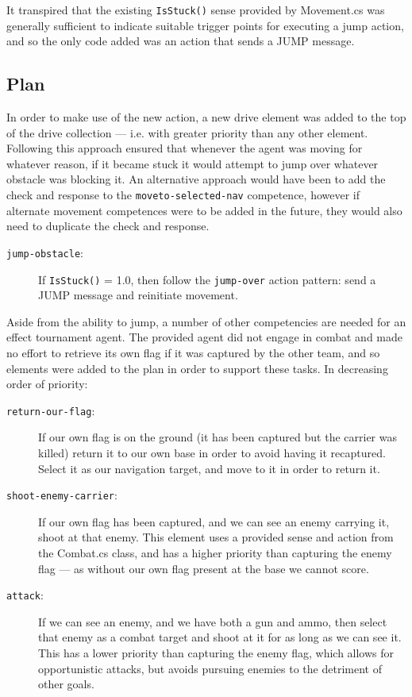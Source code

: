 \documentclass[a4paper,12pt]{article}
\begin{document}
It transpired that the existing \texttt{IsStuck()} sense provided by Movement.cs was generally sufficient to indicate suitable trigger points for executing a jump action, and so the only code added was an action that sends a JUMP message.

\subsection{Plan}
In order to make use of the new action, a new drive element was added to the top of the drive collection --- i.e. with greater priority than any other element. Following this approach ensured that whenever the agent was moving for whatever reason, if it became stuck it would attempt to jump over whatever obstacle was blocking it. An alternative approach would have been to add the check and response to the \texttt{moveto-selected-nav} competence, however if alternate movement competences were to be added in the future, they would also need to duplicate the check and response.
\begin{description}
	\item[\texttt{jump-obstacle}:] If \texttt{IsStuck()} = 1.0, then follow the \texttt{jump-over} action pattern: send a JUMP message and reinitiate movement.
\end{description}

Aside from the ability to jump, a number of other competencies are needed for an effect tournament agent. The provided agent did not engage in combat and made no effort to retrieve its own flag if it was captured by the other team, and so elements were added to the plan in order to support these tasks. In decreasing order of priority:
\begin{description}
	\item[\texttt{return-our-flag}:] If our own flag is on the ground (it has been captured but the carrier was killed) return it to our own base in order to avoid having it recaptured. Select it as our navigation target, and move to it in order to return it.
	\item[\texttt{shoot-enemy-carrier}:] If our own flag has been captured, and we can see an enemy carrying it, shoot at that enemy. This element uses a provided sense and action from the Combat.cs class, and has a higher priority than capturing the enemy flag --- as without our own flag present at the base we cannot score.
	\item[\texttt{attack}:] If we can see an enemy, and we have both a gun and ammo, then select that enemy as a combat target and shoot at it for as long as we can see it. This has a lower priority than capturing the enemy flag, which allows for opportunistic attacks, but avoids pursuing enemies to the detriment of other goals.
\end{description}
\end{document}
